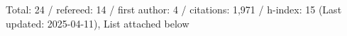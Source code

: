 Total: 24 / refereed: 14 / first author: 4 / citations: 1,971 / h-index: 15 (Last updated: 2025-04-11), List attached below